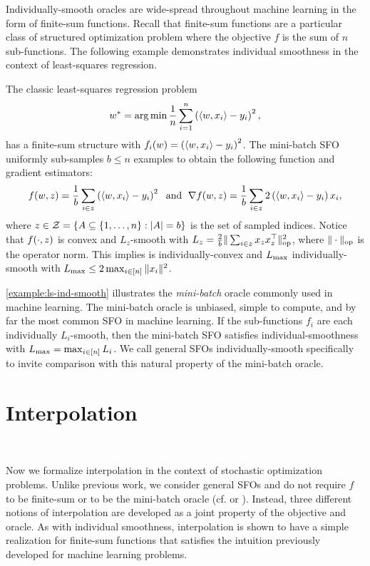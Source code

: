 Individually-smooth oracles are wide-spread throughout machine learning in the form of finite-sum functions. 
Recall that finite-sum functions are a particular class of structured optimization problem where the objective \( f \) is the sum of \( n \) sub-functions. 
The following example demonstrates individual smoothness in the context of least-squares regression. 
\begin{example}\label{example:ls-ind-smooth}
    The classic least-squares regression problem
    \[ w^* = \mathop{\rm arg\,min} \frac{1}{n} \sum_{i=1}^n \left(\left\langle w, x_i\right\rangle - y_i\right)^2, \]
    has a finite-sum structure with \( f_i(w) =  \left(\left\langle w, x_i\right\rangle - y_i\right)^2\).
    The mini-batch \ac{SFO} uniformly sub-samples \( b \leq n \) examples to obtain the following function and gradient estimators:
    \[ f(w, z) = \frac{1}{b} \sum_{i \in z}  \left(\left\langle w, x_i\right\rangle - y_i\right)^2 \; \text{ and } \; \nabla f(w, z) = \frac{1}{b} \sum_{i \in z} 2 \left(\left\langle w, x_i\right\rangle - y_i\right) x_i, \]
    where \( z \in \mathcal{Z} = \left\{ A \subseteq \left\{1, \dots, n\right\} : |A| = b \right\} \) is the set of sampled indices.
    Notice that \( f(\cdot, z) \) is convex and \( L_z \)-smooth with \( L_z = \frac{2}{b} \|\sum_{i \in z} x_z x_z^\top\|_\text{op}^2 \), where $\|\cdot\|_{\text{op}}$ is the operator norm.
    This implies \oracle{} is individually-convex and \( L_{\text{max}} \) individually-smooth with \( L_{\text{max}} \leq 2 \max_{i \in [n]} \|x_i\|^2 \). 
\end{example}

\autoref{example:ls-ind-smooth} illustrates the \emph{mini-batch} oracle commonly used in machine learning.
The mini-batch oracle is unbiased, simple to compute, and by far the most common \ac{SFO} in machine learning. 
If the sub-functions \( f_i \) are each individually \( L_i \)-smooth, then the mini-batch \ac{SFO} satisfies individual-smoothness with \( L_{\text{max}} = \max_{i\in [n]} L_i \).
We call general \acp{SFO} individually-smooth specifically to invite comparison with this natural property of the mini-batch oracle. 


\section{Interpolation}~\label{sec:interpolation}

Now we formalize interpolation in the context of stochastic optimization problems.
Unlike previous work, we consider general \acp{SFO} and do not require \( f \) to be finite-sum or \oracle{} to be the mini-batch oracle (cf. \citet{vaswani2019fast} or \citet{bassily2018exponential}).
Instead, three different notions of interpolation are developed as a joint property of the objective and oracle. 
As with individual smoothness, interpolation is shown to have a simple realization for finite-sum functions that satisfies the intuition previously developed for machine learning problems. 

